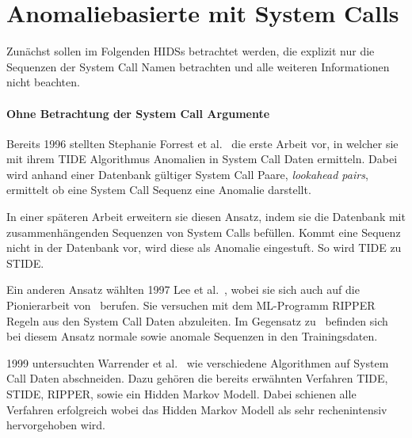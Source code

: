     \section{Anomaliebasierte  mit System Calls}

        Zunächst sollen im Folgenden \acp{HIDS} betrachtet werden, die explizit nur die Sequenzen der System Call Namen betrachten und alle weiteren Informationen nicht beachten.

        \paragraph{Ohne Betrachtung der System Call Argumente}\label{sec:related_no_arg}
                Bereits 1996 stellten Stephanie Forrest et al.~\cite{FORREST} die erste Arbeit vor, in welcher sie mit ihrem \ac{TIDE} Algorithmus Anomalien in System Call Daten ermitteln.
                Dabei wird anhand einer Datenbank gültiger System Call Paare, \textit{lookahead pairs}, ermittelt ob eine System Call Sequenz eine Anomalie darstellt.\par\medskip

                In einer späteren Arbeit erweitern sie diesen Ansatz, indem sie die Datenbank mit zusammenhängenden Sequenzen von System Calls befüllen.
                Kommt eine Sequenz nicht in der Datenbank vor, wird diese als Anomalie eingestuft.
                So wird \ac{TIDE} zu \ac{STIDE}.~\cite{STIDE}\par\medskip

                Ein anderen Ansatz wählten 1997 Lee et al.~\cite{LEE1997}, wobei sie sich auch auf die Pionierarbeit von~\cite{FORREST} berufen.
                Sie versuchen mit dem \ac{ML}-Programm RIPPER Regeln aus den System Call Daten abzuleiten.
                Im Gegensatz zu~\cite{FORREST} befinden sich bei diesem Ansatz normale sowie anomale Sequenzen in den Trainingsdaten.\par\medskip

                1999 untersuchten Warrender et al.~\cite{STIDE_Alternatives} wie verschiedene Algorithmen auf System Call Daten abschneiden.
                Dazu gehören die bereits erwähnten Verfahren \ac{TIDE}, \ac{STIDE}, RIPPER, sowie ein Hidden Markov Modell.
                Dabei schienen alle Verfahren erfolgreich wobei das Hidden Markov Modell als sehr rechenintensiv hervorgehoben wird.\par\medskip
         
